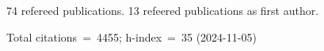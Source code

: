 74 refereed publications. 13 refeered publications as first author.

Total citations~=~4455; h-index~=~35 (2024-11-05)